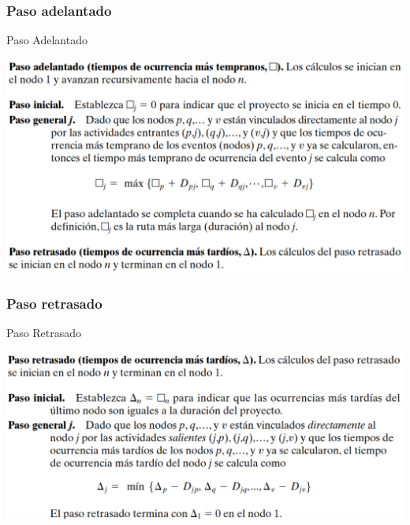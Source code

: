 \documentclass{beamer}
\begin{document}
\subsubsection{Paso adelantado}
\begin{frame}{Paso Adelantado}
    \begin{center}
        \includegraphics[width=\linewidth]{images/08_paso_adelantado.png}
    \end{center}
\end{frame}

\subsubsection{Paso retrasado}
\begin{frame}{Paso Retrasado}
    \begin{center}
        \includegraphics[width=\linewidth]{images/08_paso_retrasado.png}
    \end{center}
\end{frame}
\end{document}
